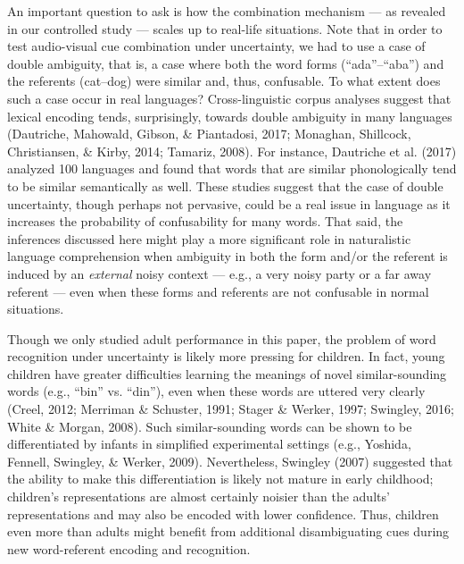 \documentclass[english,,man,floatsintext]{apa6}
\theoremstyle{definition}
\theoremstyle{definition}
\theoremstyle{definition}
\theoremstyle{remark}
\begin{document}
An important question to ask is how the combination mechanism --- as
revealed in our controlled study --- scales up to real-life situations.
Note that in order to test audio-visual cue combination under
uncertainty, we had to use a case of double ambiguity, that is, a case
where both the word forms (\enquote{ada}--\enquote{aba}) and the
referents (cat--dog) were similar and, thus, confusable. To what extent
does such a case occur in real languages? Cross-linguistic corpus
analyses suggest that lexical encoding tends, surprisingly, towards
double ambiguity in many languages (Dautriche, Mahowald, Gibson, \&
Piantadosi, 2017; Monaghan, Shillcock, Christiansen, \& Kirby, 2014;
Tamariz, 2008). For instance, Dautriche et al. (2017) analyzed 100
languages and found that words that are similar phonologically tend to
be similar semantically as well. These studies suggest that the case of
double uncertainty, though perhaps not pervasive, could be a real issue
in language as it increases the probability of confusability for many
words. That said, the inferences discussed here might play a more
significant role in naturalistic language comprehension when ambiguity
in both the form and/or the referent is induced by an \emph{external}
noisy context --- e.g., a very noisy party or a far away referent ---
even when these forms and referents are not confusable in normal
situations.

Though we only studied adult performance in this paper, the problem of
word recognition under uncertainty is likely more pressing for children.
In fact, young children have greater difficulties learning the meanings
of novel similar-sounding words (e.g., \enquote{bin} vs. \enquote{din}),
even when these words are uttered very clearly (Creel, 2012; Merriman \&
Schuster, 1991; Stager \& Werker, 1997; Swingley, 2016; White \& Morgan,
2008). Such similar-sounding words can be shown to be differentiated by
infants in simplified experimental settings (e.g., Yoshida, Fennell,
Swingley, \& Werker, 2009). Nevertheless, Swingley (2007) suggested that
the ability to make this differentiation is likely not mature in early
childhood; children's representations are almost certainly noisier than
the adults' representations and may also be encoded with lower
confidence. Thus, children even more than adults might benefit from
additional disambiguating cues during new word-referent encoding and
recognition.
\end{document}
